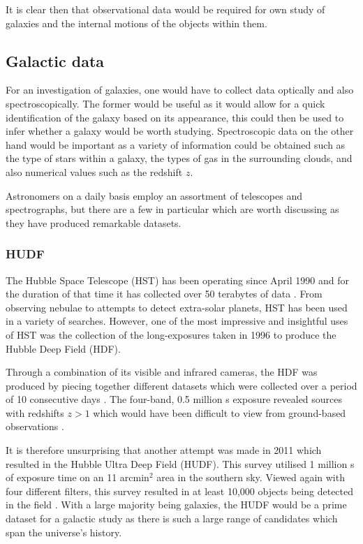 \documentclass[12pt, twocolumn]{revtex4}    %
\begin{document}
It is clear then that observational data would be required for own study of galaxies and the internal motions of the objects within them. 

\subsection{Galactic data} 

For an investigation of galaxies, one would have to collect data optically and also spectroscopically. The former would be useful as it would allow for a quick identification of the galaxy based on its appearance, this could then be used to infer whether a galaxy would be worth studying. Spectroscopic data on the other hand would be important as a variety of information could be obtained such as the type of stars within a galaxy, the types of gas in the surrounding clouds, and also numerical values such as the redshift $z$. 

Astronomers on a daily basis employ an assortment of telescopes and spectrographs, but there are a few in particular which are worth discussing as they have produced remarkable datasets.

\subsubsection{HUDF}

The Hubble Space Telescope (HST) has been operating since April 1990 and for the duration of that time it has collected over 50 terabytes of data \citep{mccoy_space_sciences}. From observing nebulae to attempts to detect extra-solar planets, HST has been used in a variety of searches. However, one of the most impressive and insightful uses of HST was the collection of the long-exposures taken in 1996 to produce the Hubble Deep Field (HDF). 

Through a combination of its visible and infrared cameras, the HDF was produced by piecing together different datasets which were collected over a period of 10 consecutive days \citep{mccoy_space_sciences, williams_hdp}. The four-band, 0.5 million s exposure revealed sources with redshifts $z>1$ which would have been difficult to view from ground-based observations \citep{beckwith_hudf}. 


It is therefore unsurprising that another attempt was made in 2011 which resulted in the Hubble Ultra Deep Field (HUDF). This survey utilised 1 million s of exposure time on an 11 arcmin$^2$ area in the southern sky. Viewed again with four different filters, this survey resulted in at least 10,000 objects being detected in the field \citep{beckwith_hudf}. With a large majority being galaxies, the HUDF would be a prime dataset for a galactic study as there is such a large range of candidates which span the universe's history. 
\end{document}

